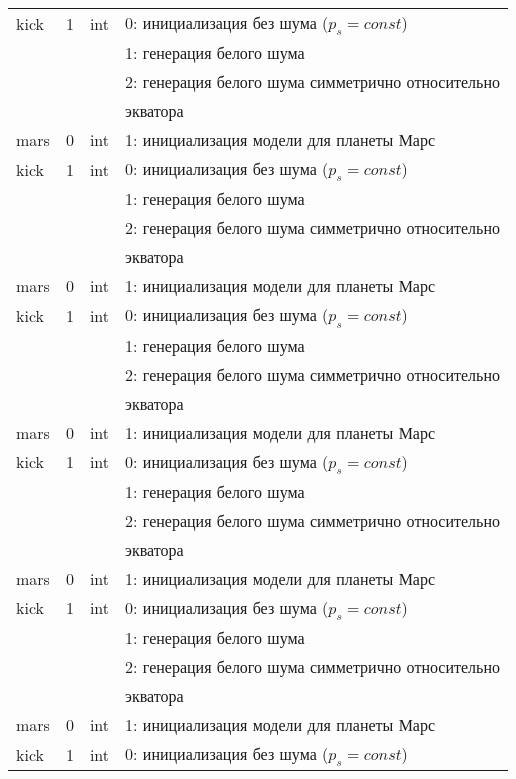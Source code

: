 \begin{longtable}[c]{|l|c|l|l|}
    kick & 1 & int & 0: инициализация без шума ($p_s = const$) \\
          &   &     & 1: генерация белого шума                  \\
          &   &     & 2: генерация белого шума симметрично относительно \\
      & & & экватора    \\
     mars & 0 & int & 1: инициализация модели для планеты Марс     \\
    kick & 1 & int & 0: инициализация без шума ($p_s = const$) \\
          &   &     & 1: генерация белого шума                  \\
          &   &     & 2: генерация белого шума симметрично относительно \\
      & & & экватора    \\
     mars & 0 & int & 1: инициализация модели для планеты Марс     \\
    kick & 1 & int & 0: инициализация без шума ($p_s = const$) \\
          &   &     & 1: генерация белого шума                  \\
          &   &     & 2: генерация белого шума симметрично относительно \\
      & & & экватора    \\
     mars & 0 & int & 1: инициализация модели для планеты Марс     \\
    kick & 1 & int & 0: инициализация без шума ($p_s = const$) \\
          &   &     & 1: генерация белого шума                  \\
          &   &     & 2: генерация белого шума симметрично относительно \\
      & & & экватора    \\
     mars & 0 & int & 1: инициализация модели для планеты Марс     \\
    kick & 1 & int & 0: инициализация без шума ($p_s = const$) \\
          &   &     & 1: генерация белого шума                  \\
          &   &     & 2: генерация белого шума симметрично относительно \\
      & & & экватора    \\
     mars & 0 & int & 1: инициализация модели для планеты Марс     \\
    kick & 1 & int & 0: инициализация без шума ($p_s = const$) \\

\end{longtable}
